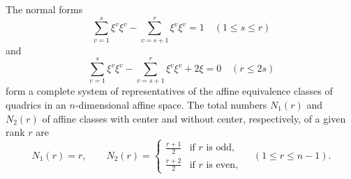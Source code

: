 The normal forms
$$\sum_{v=1}^{s} \xi^v \xi^v - \sum_{v=s+1}^{r} \xi^v \xi^v = 1 \quad (1 \leq s \leq r)$$
and
$$\sum_{v=1}^{s} \xi^v \xi^v - \sum_{v=s+1}^{r} \xi^v \xi^v + 2\xi = 0 \quad (r \leq 2s)$$
form a complete system of representatives of the affine equivalence classes of quadrics in an $n$-dimensional affine space. The total numbers $N_1(r)$ and $N_2(r)$ of affine classes with center and without center, respectively, of a given rank $r$ are
$$N_1(r) = r, \qquad N_2(r) = \begin{cases} \frac{r+1}{2} & \text{if } r \text{ is odd}, \\ \frac{r+2}{2} & \text{if } r \text{ is even}, \end{cases} \quad (1 \leq r \leq n-1).$$

